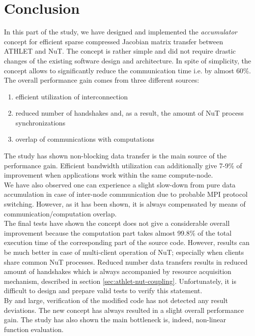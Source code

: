 \section{Conclusion}
\label{sec:accumulator-conclusions}


In this part of the study, we have designed and implemented the \textit{accumulator} concept for efficient sparse compressed Jacobian matrix transfer between ATHLET and NuT. The concept is rather simple and did not require drastic changes of the existing software design and architecture. In spite of simplicity, the concept allows to significantly reduce the communication time i.e. by almost 60\%. The overall performance gain comes from three different sources: 

\begin{enumerate}
	\item efficient utilization of interconnection
	\item reduced number of handshakes and, as a result, the amount of NuT process synchronizations
	\item overlap of communications with computations
\end{enumerate}

The study has shown non-blocking data transfer is the main source of the performance gain. Efficient bandwidth utilization can additionally give 7-9\% of improvement when applications work within the same compute-node.\\


We have also observed one can experience a slight slow-down from pure data accumulation in case of inter-node communication due to probable MPI protocol switching. However, as it has been shown, it is always compensated by means of communication/computation overlap.\\


The final tests have shown the concept does not give a considerable overall improvement because the computation part takes almost 99.8\% of the total execution time of the corresponding part of the source code. However, results can be much better in case of multi-client operation of NuT; especially when clients share common NuT processes. Reduced number data transfers results in reduced amount of handshakes which is always accompanied by resource acquisition mechanism, described in section \ref{sec:athlet-nut-coupling}. Unfortunately, it is difficult to design and prepare valid tests to verify this statement. \\


By and large, verification of the modified code has not detected any result deviations. The new concept has always resulted in a slight overall performance gain. The study has also shown the main bottleneck is, indeed, non-linear function evaluation.\\


